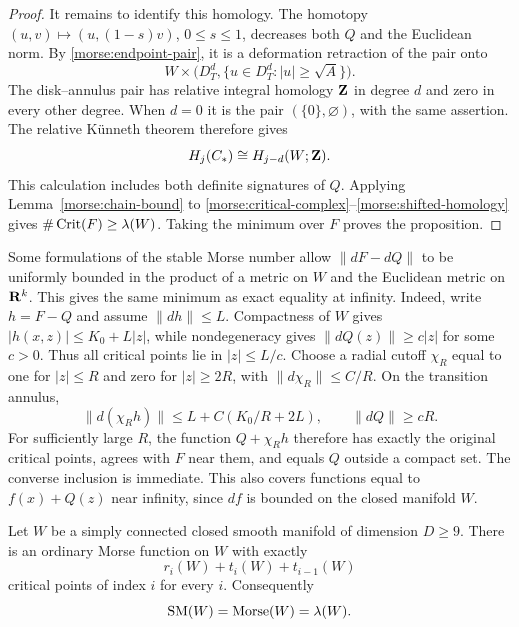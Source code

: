 \begin{proof}
It remains to identify this homology.  The homotopy
$(u,v)\mapsto(u,(1-s)v)$, $0\leq s\leq1$, decreases both $Q$ and
the Euclidean norm.  By \eqref{morse:endpoint-pair}, it is a deformation
retraction of the pair onto
\[
 W\times\bigl(D_T^d,\{u\in D_T^d:|u|\geq\sqrt A\}\bigr).
\]
The disk--annulus pair has relative integral homology $\mathbf Z$ in degree
$d$ and zero in every other degree.  When $d=0$ it is the pair
$(\{0\},\varnothing)$, with the same assertion.  The relative
K\"unneth theorem therefore gives
\begin{equation}\label{morse:shifted-homology}
 H_j(C_*)\cong H_{j-d}(W;\mathbf Z).
\end{equation}
This calculation includes both definite signatures of $Q$.
Applying Lemma~\ref{morse:chain-bound} to
\eqref{morse:critical-complex}--\eqref{morse:shifted-homology} gives
$\#\operatorname{Crit}(F)\geq\lambda(W)$.  Taking the minimum over $F$ proves
the proposition.
\end{proof}

\begin{remark}\label{morse:infinity-conventions}
Some formulations of the stable Morse number allow
$\|dF-dQ\|$ to be uniformly bounded in the product of a metric on
$W$ and the Euclidean metric on $\mathbf R^k$.
This gives the same minimum as exact equality at infinity.
Indeed, write $h=F-Q$ and assume $\|dh\|\leq L$.
Compactness of $W$ gives $|h(x,z)|\leq K_0+L|z|$, while
nondegeneracy gives $\|dQ(z)\|\geq c|z|$ for some $c>0$.
Thus all critical points lie in $|z|\leq L/c$.
Choose a radial cutoff $\chi_R$ equal to one for $|z|\leq R$ and
zero for $|z|\geq2R$, with $\|d\chi_R\|\leq C/R$.
On the transition annulus,
\[
 \|d(\chi_Rh)\|\leq L+C(K_0/R+2L),
 \qquad \|dQ\|\geq cR.
\]
For sufficiently large $R$, the function $Q+\chi_Rh$ therefore
has exactly the original critical points, agrees with $F$ near them,
and equals $Q$ outside a compact set.  The converse inclusion is
immediate.  This also covers functions equal to $f(x)+Q(z)$ near
infinity, since $df$ is bounded on the closed manifold $W$.
\end{remark}

\begin{theorem}[Smale]\label{morse:equality}
Let $W$ be a simply connected closed smooth manifold of dimension
$D\geq9$.  There is an ordinary Morse function on $W$ with exactly
\[
 r_i(W)+t_i(W)+t_{i-1}(W)
\]
critical points of index $i$ for every $i$.  Consequently
\begin{equation}\label{morse:three-equal}
 \operatorname{SM}(W)=\operatorname{Morse}(W)=\lambda(W).
\end{equation}
\end{theorem}

